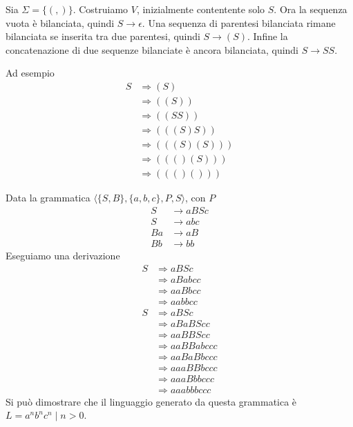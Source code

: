 \documentclass[12pt]{report}
\begin{document}
\begin{tcolorbox}%
	Sia $\Sigma = \{ (, ) \}$.
	Costruiamo $V$, inizialmente contentente solo $S$.
	Ora la sequenza vuota è bilanciata, quindi $S \rightarrow \epsilon$.
	Una sequenza di parentesi bilanciata rimane bilanciata se inserita tra due parentesi, quindi $S \rightarrow (S)$.
	Infine la concatenazione di due sequenze bilanciate è ancora bilanciata, quindi $S \rightarrow S S $.

	Ad esempio 
	\begin{align*}
		S &\Rightarrow ( S ) \\
		  &\Rightarrow ( ( S ) ) \\
		  &\Rightarrow ( ( S S ) ) \\
		  &\Rightarrow ( ( ( S ) S ) ) \\
		  &\Rightarrow ( ( ( S ) ( S ) ) ) \\
		  &\Rightarrow ( ( ( ) ( S ) ) ) \\
		  & \Rightarrow ( ( ( ) ( ) ) ) 
	\end{align*}
\end{tcolorbox}

\begin{tcolorbox}
	Data la grammatica $\langle \{S, B\}, \{a, b, c\}, P, S \rangle$, con $P$
	\begin{align*}
		S &\rightarrow a B S c \\
		S &\rightarrow a b c \\
		B a &\rightarrow a B \\
		B b &\rightarrow b b 
	\end{align*}
	Eseguiamo una derivazione
	\begin{align*}
		S &\Rightarrow a B S c \\
		  &\Rightarrow a B a b c c \\
		  &\Rightarrow a a B b c c \\
		  &\Rightarrow a a b b c c \\
		S &\Rightarrow a B S c \\
		  &\Rightarrow a B a B S c c \\
		  &\Rightarrow a a B B S c c \\
		  &\Rightarrow a a B B a b c c c \\
		  &\Rightarrow a a B a B b c c c \\
		  &\Rightarrow a a a B B b c c c \\
		  &\Rightarrow a a a B b b c c c \\
		  &\Rightarrow a a a b b b c c c
	\end{align*}
	Si può dimostrare che il linguaggio generato da questa grammatica è $L = {a^nb^nc^n \mid n > 0 }$.
\end{tcolorbox}
\end{document}
